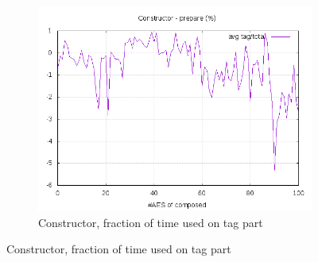 \documentclass[10pt,a4paper]{article}
\begin{document}
\begin{figure}[h]
\begin{subfigure}[t]{0.3\textwidth}
        \includegraphics[width=\textwidth]{const_prepare_frac}
        \caption{Constructor, fraction of time used on tag part}
    \end{subfigure}


\end{figure}
\end{document}
